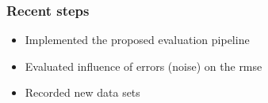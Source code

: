 \documentclass[xcolor={x11names}]{beamer}
\begin{document}

\begin{frame}
\frametitle{Recent steps}
\begin{itemize}
  \item Implemented the proposed evaluation pipeline
  \item Evaluated influence of errors (noise) on the rmse
  \item Recorded new data sets
\end{itemize}
\end{frame}


\begin{frame}
\end{frame}
\end{document}
